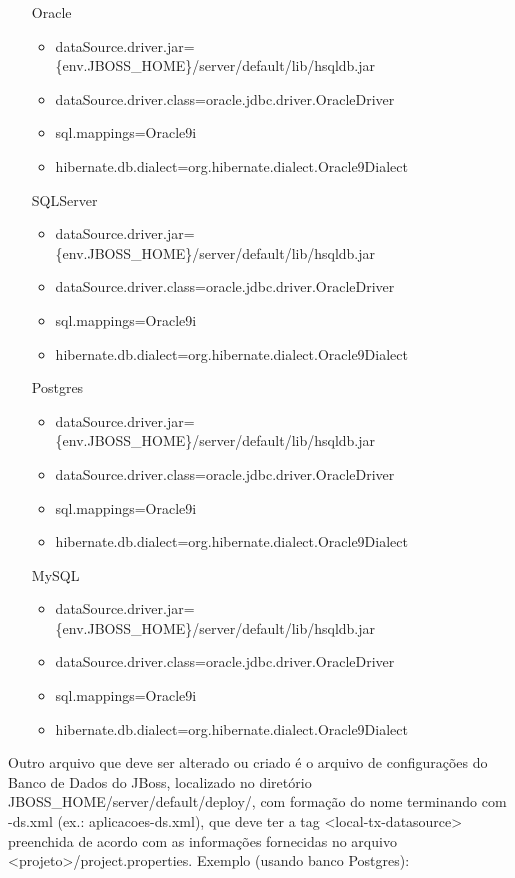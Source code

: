 \begin{itemize}
	\item [Oracle] \hfill
		\begin{itemize}
			\item
			dataSource.driver.jar=\textdollar{}\{env.JBOSS\_HOME\}/server/default/lib/hsqldb.jar
			\item dataSource.driver.class=oracle.jdbc.driver.OracleDriver
			\item sql.mappings=Oracle9i
			\item hibernate.db.dialect=org.hibernate.dialect.Oracle9Dialect
		\end{itemize}
	\item [SQLServer] \hfill
		\begin{itemize}
			\item
			dataSource.driver.jar=\textdollar{}\{env.JBOSS\_HOME\}/server/default/lib/hsqldb.jar
			\item dataSource.driver.class=oracle.jdbc.driver.OracleDriver
			\item sql.mappings=Oracle9i
			\item hibernate.db.dialect=org.hibernate.dialect.Oracle9Dialect
		\end{itemize} 
	\item [Postgres] \hfill
  		\begin{itemize}
			\item
			dataSource.driver.jar=\textdollar{}\{env.JBOSS\_HOME\}/server/default/lib/hsqldb.jar
			\item dataSource.driver.class=oracle.jdbc.driver.OracleDriver
			\item sql.mappings=Oracle9i
			\item hibernate.db.dialect=org.hibernate.dialect.Oracle9Dialect
		\end{itemize}
	\item [MySQL] \hfill
		\begin{itemize}
			\item
			dataSource.driver.jar=\textdollar{}\{env.JBOSS\_HOME\}/server/default/lib/hsqldb.jar
			\item dataSource.driver.class=oracle.jdbc.driver.OracleDriver
			\item sql.mappings=Oracle9i
			\item hibernate.db.dialect=org.hibernate.dialect.Oracle9Dialect
		\end{itemize}
\end{itemize}

Outro arquivo que deve ser alterado ou criado é o arquivo de configurações do Banco de
Dados do JBoss, localizado no diretório JBOSS\_HOME/server/default/deploy/, com
formação do nome terminando com -ds.xml (ex.: aplicacoes-ds.xml), que deve ter a tag <local-tx-datasource> preenchida de acordo com as informações fornecidas no arquivo <projeto>/project.properties.
Exemplo (usando banco Postgres):

